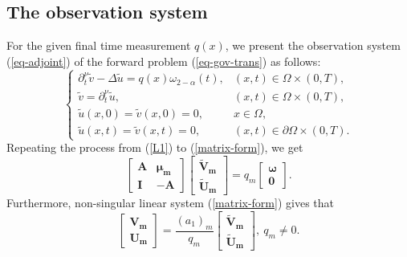 \documentclass[11pt]{article}
\numberwithin{equation}{section}
\begin{document}
\subsection{The observation system}
For the given final time measurement $q(x)$, we present the observation system (\ref{eq-adjoint}) of the forward problem (\ref{eq-gov-trans}) as follows:
\begin{equation}\label{eq-adjoint}
\begin{cases}
  \partial_t^\nu  \widetilde{v} - \Delta  \widetilde{u} = q(x)\omega_{2-\alpha}(t), & (x,t) \in \Omega \times (0,T), \\
   \widetilde{v}  = \partial_t^\nu  \widetilde{u}, & (x,t) \in \Omega \times (0,T), \\
   \widetilde{u}(x,0) =  \widetilde{v}(x,0)=0, & x \in \Omega, \\
   \widetilde{u}(x,t) =  \widetilde{v}(x,t)=0, & (x,t) \in \partial \Omega \times (0,T).
\end{cases}
\end{equation}
Repeating the process from (\ref{L1}) to (\ref{matrix-form}), we get 
\begin{equation*}
\left[
\begin{array}{cc}
\boldsymbol{A} & \boldsymbol{\mu_m}\\
\boldsymbol{I} & \boldsymbol{-A}
\end{array}
\right]\left[
\begin{array}{c}
\boldsymbol{ \widetilde{V}_m} \\
\boldsymbol{ \widetilde{U}_m} 
\end{array}
\right]
=q_m\left[
\begin{array}{c}
\boldsymbol{\omega} \\
\boldsymbol{0} 
\end{array}
\right].
\end{equation*}
Furthermore, non-singular linear system (\ref{matrix-form}) gives that
\begin{equation}\label{matrix-form-adjoint-1}
\left[
\begin{array}{c}
\boldsymbol{ V_m} \\
\boldsymbol{ U_m} 
\end{array}
\right]=\frac{(a_1)_m}{q_m}\left[
\begin{array}{c}
\boldsymbol{ \widetilde{V}_m} \\
\boldsymbol{ \widetilde{U}_m} 
\end{array}
\right], ~q_m\neq 0.
\end{equation}
\end{document}
